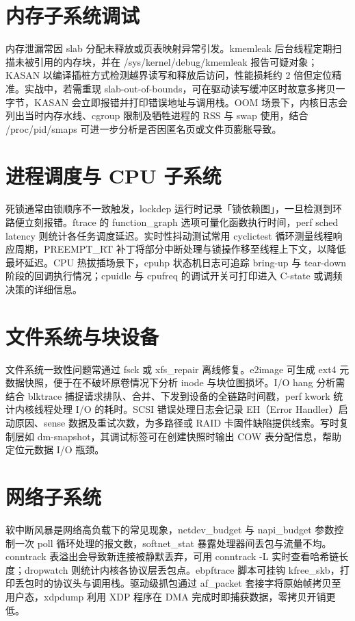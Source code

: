 \chapter{内存子系统调试}
内存泄漏常因 slab 分配未释放或页表映射异常引发。kmemleak 后台线程定期扫描未被引用的内存块，并在 /sys/kernel/debug/kmemleak 报告可疑对象；KASAN 以编译插桩方式检测越界读写和释放后访问，性能损耗约 2 倍但定位精准。实战中，若需重现 slab-out-of-bounds，可在驱动读写缓冲区时故意多拷贝一字节，KASAN 会立即报错并打印错误地址与调用栈。OOM 场景下，内核日志会列出当时内存水线、cgroup 限制及牺牲进程的 RSS 与 swap 使用，结合 /proc/pid/smaps 可进一步分析是否因匿名页或文件页膨胀导致。\par
\chapter{进程调度与 CPU 子系统}
死锁通常由锁顺序不一致触发，lockdep 运行时记录「锁依赖图」，一旦检测到环路便立刻报错。ftrace 的 function\_{}graph 选项可量化函数执行时间，perf sched latency 则统计各任务调度延迟。实时性抖动测试常用 cyclictest 循环测量线程响应周期，PREEMPT\_{}RT 补丁将部分中断处理与锁操作移至线程上下文，以降低最坏延迟。CPU 热拔插场景下，cpuhp 状态机日志可追踪 bring-up 与 tear-down 阶段的回调执行情况；cpuidle 与 cpufreq 的调试开关可打印进入 C-state 或调频决策的详细信息。\par
\chapter{文件系统与块设备}
文件系统一致性问题常通过 fsck 或 xfs\_{}repair 离线修复。e2image 可生成 ext4 元数据快照，便于在不破坏原卷情况下分析 inode 与块位图损坏。I/O hang 分析需结合 blktrace 捕捉请求排队、合并、下发到设备的全链路时间戳，perf kwork 统计内核线程处理 I/O 的耗时。SCSI 错误处理日志会记录 EH（Error Handler）启动原因、sense 数据及重试次数，为多路径或 RAID 卡固件缺陷提供线索。写时复制层如 dm-snapshot，其调试标签可在创建快照时输出 COW 表分配信息，帮助定位元数据 I/O 瓶颈。\par
\chapter{网络子系统}
软中断风暴是网络高负载下的常见现象，netdev\_{}budget 与 napi\_{}budget 参数控制一次 poll 循环处理的报文数，softnet\_{}stat 暴露处理器间丢包与流量不均。conntrack 表溢出会导致新连接被静默丢弃，可用 conntrack -L 实时查看哈希链长度；dropwatch 则统计内核各协议层丢包点。ebpftrace 脚本可挂钩 kfree\_{}skb，打印丢包时的协议头与调用栈。驱动级抓包通过 af\_{}packet 套接字将原始帧拷贝至用户态，xdpdump 利用 XDP 程序在 DMA 完成时即捕获数据，零拷贝开销更低。\par
